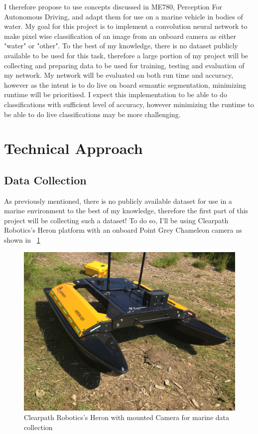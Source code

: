 \documentclass[10pt,twocolumn,letterpaper]{article}
\begin{document}
I therefore propose to use concepts discussed in ME780, Perception For Autonomous Driving,
and adapt them for use on a marine vehicle in bodies of water. My goal for this project
is to implement a convolution neural network to make pixel wise classification of an image
from an onboard camera as either "water" or "other". To the best of my knowledge, there is no
dataset publicly available to be used for this task, therefore a large portion of my project will be
collecting and preparing data to be used for training, testing and evaluation of my network. 
My network will be evaluated on both run time and accuracy, however as the intent is to do
live on board semantic segmentation, minimizing runtime will be prioritised. I expect this
implementation to be able to do classifications with sufficient level of accuracy, however
minimizing the runtime to be able to do live classifications may be more challenging.



\section{Technical Approach}
\subsection{Data Collection}
As previously mentioned, there is no publicly available dataset for use in a marine
environment to the best of my knowledge, therefore the first part of this project
will be collecting such a dataset! To do so, I'll be using Clearpath Robotics's
Heron platform with an onboard Point Grey Chameleon camera as shown in ~\ref{fig:heron}

\begin{figure}[h]	
\begin{center}
  \includegraphics[width=1.0\linewidth]{heron.JPG}
\end{center}
   \caption{Clearpath Robotics's Heron with mounted Camera for marine data collection}
\label{fig:heron}
\end{figure}
\end{document}

